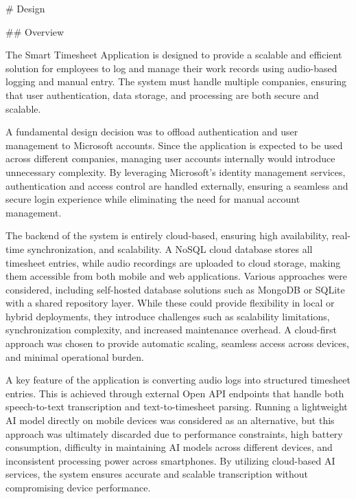 \documentclass[
  digital,     %
  oneside,     %
  nosansbold,  %
  nocolorbold, %
  lof,         %
  lot,         %
]{fithesis4}
\begin{document}
\shorthandoff{-}
\begin{markdown}

# Design

## Overview

The Smart Timesheet Application is designed to provide a scalable and efficient solution for employees to log and manage their work records using audio-based logging and manual entry. The system must handle multiple companies, ensuring that user authentication, data storage, and processing are both secure and scalable.

A fundamental design decision was to offload authentication and user management to Microsoft accounts. Since the application is expected to be used across different companies, managing user accounts internally would introduce unnecessary complexity. By leveraging Microsoft's identity management services, authentication and access control are handled externally, ensuring a seamless and secure login experience while eliminating the need for manual account management.

The backend of the system is entirely cloud-based, ensuring high availability, real-time synchronization, and scalability. A NoSQL cloud database stores all timesheet entries, while audio recordings are uploaded to cloud storage, making them accessible from both mobile and web applications. Various approaches were considered, including self-hosted database solutions such as MongoDB or SQLite with a shared repository layer. While these could provide flexibility in local or hybrid deployments, they introduce challenges such as scalability limitations, synchronization complexity, and increased maintenance overhead. A cloud-first approach was chosen to provide automatic scaling, seamless access across devices, and minimal operational burden.

A key feature of the application is converting audio logs into structured timesheet entries. This is achieved through external Open API endpoints that handle both speech-to-text transcription and text-to-timesheet parsing. Running a lightweight AI model directly on mobile devices was considered as an alternative, but this approach was ultimately discarded due to performance constraints, high battery consumption, difficulty in maintaining AI models across different devices, and inconsistent processing power across smartphones. By utilizing cloud-based AI services, the system ensures accurate and scalable transcription without compromising device performance.


\end{markdown}
\end{document}
